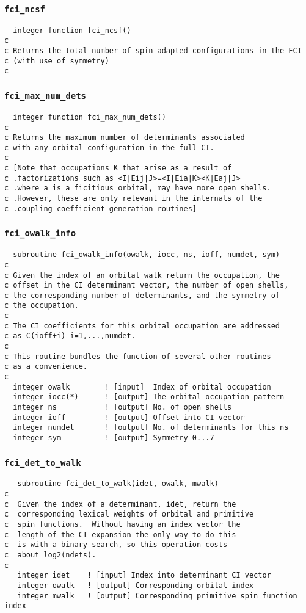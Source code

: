 \documentclass[fullpage,12pt,fleqn]{article}
\begin{document}
\subsubsection{{\tt fci\_ncsf}}
\begin{verbatim}
  integer function fci_ncsf()
c
c Returns the total number of spin-adapted configurations in the FCI
c (with use of symmetry)
c
\end{verbatim}

\subsubsection{{\tt fci\_max\_num\_dets}}
\begin{verbatim}
  integer function fci_max_num_dets()
c
c Returns the maximum number of determinants associated
c with any orbital configuration in the full CI.
c
c [Note that occupations K that arise as a result of
c .factorizations such as <I|Eij|J>=<I|Eia|K><K|Eaj|J>
c .where a is a ficitious orbital, may have more open shells.  
c .However, these are only relevant in the internals of the 
c .coupling coefficient generation routines]
\end{verbatim}

\subsubsection{{\tt fci\_owalk\_info}}
\label{sec:fciowalkinfo}
\begin{verbatim}
  subroutine fci_owalk_info(owalk, iocc, ns, ioff, numdet, sym)
c     
c Given the index of an orbital walk return the occupation, the 
c offset in the CI determinant vector, the number of open shells,
c the corresponding number of determinants, and the symmetry of 
c the occupation.  
c  
c The CI coefficients for this orbital occupation are addressed
c as C(ioff+i) i=1,...,numdet.
c     
c This routine bundles the function of several other routines
c as a convenience.
c     
  integer owalk        ! [input]  Index of orbital occupation
  integer iocc(*)      ! [output] The orbital occupation pattern
  integer ns           ! [output] No. of open shells
  integer ioff         ! [output] Offset into CI vector
  integer numdet       ! [output] No. of determinants for this ns
  integer sym          ! [output] Symmetry 0...7
\end{verbatim}

\subsubsection{{\tt fci\_det\_to\_walk}}
\begin{verbatim}
   subroutine fci_det_to_walk(idet, owalk, mwalk)
c
c  Given the index of a determinant, idet, return the
c  corresponding lexical weights of orbital and primitive
c  spin functions.  Without having an index vector the
c  length of the CI expansion the only way to do this
c  is with a binary search, so this operation costs 
c  about log2(ndets).
c
   integer idet    ! [input] Index into determinant CI vector
   integer owalk   ! [output] Corresponding orbital index
   integer mwalk   ! [output] Corresponding primitive spin function index
\end{verbatim}
\end{document}
